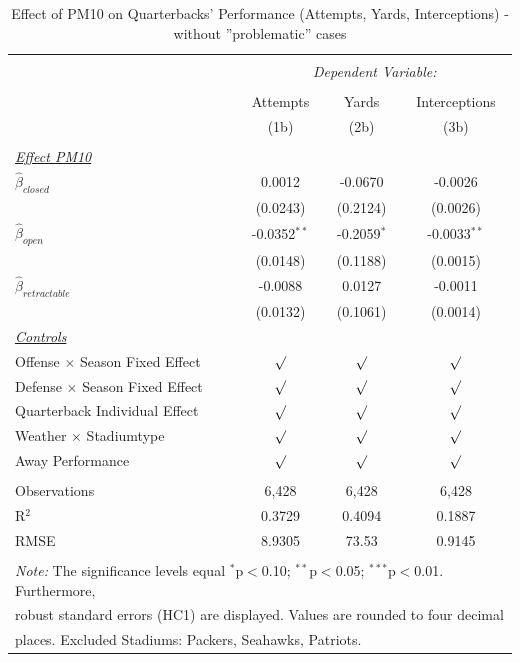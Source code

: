\documentclass[12pt,a4paper]{article}
\begin{document}
{\begin{table}[!htbp] \centering 
  \caption{Effect of PM10 on Quarterbacks' Performance (Attempts, Yards, Interceptions) - without ''problematic'' cases} 
  \label{A:T2} 
\begin{tabular}{@{\extracolsep{5pt}}lccc} 
\hline \\[-1.8ex] 
& \multicolumn{3}{c}{\textit{Dependent Variable:}} \\ \cline{2-4} \\ [-1.8ex]
& Attempts & Yards & Interceptions \\ 
& (1b) & (2b) & (3b)\\ \hline \\[-1.8ex] 
\underline{\textit{Effect PM10}}\\[0.4cm]
$\hat{\beta}_{closed}$& 0.0012 & -0.0670 & -0.0026 \\ 
& (0.0243)  & (0.2124)& (0.0026) \\[0.4cm]
$\hat{\beta}_{open}$& -0.0352$^{**}$ & -0.2059$^{*}$ & -0.0033$^{**}$\\ 
& (0.0148) & (0.1188) & (0.0015) \\[0.4cm]
$\hat{\beta}_{retractable}$& -0.0088 & 0.0127 & -0.0011 \\ 
& (0.0132) & (0.1061) & (0.0014)\\ [0.4cm]
\underline{\textit{Controls}} \\[0.4cm]
Offense $\times$ Season Fixed Effect & $\surd$ & $\surd$ & $\surd$ \\[0.4cm]
Defense $\times$ Season Fixed Effect & $\surd$ & $\surd$  & $\surd$ \\[0.4cm]
Quarterback Individual Effect & $\surd$ & $\surd$ & $\surd$  \\[0.4cm]
Weather $\times $ Stadiumtype & $\surd$ & $\surd$ & $\surd$ \\[0.4cm]
Away Performance & $\surd$ & $\surd$ & $\surd$\\
\hline \\[-1.8ex] 
Observations & 6,428 & 6,428 & 6,428 \\ 
R$^{2}$ & 0.3729 & 0.4094 & 0.1887 \\ 
RMSE & 8.9305 & 73.53 & 0.9145 \\ \hline 
\hline \\[-1.8ex]  
\multicolumn{4}{l}{\footnotesize \textit{Note:} The significance levels equal {$^{*}$p$<$0.10; $^{**}$p$<$0.05; $^{***}$p$<$0.01}.  Furthermore,} \\ \multicolumn{4}{l}{\footnotesize robust standard errors (HC1) are displayed. Values are rounded to four decimal} \\ \multicolumn{4}{l}{\footnotesize places. Excluded Stadiums: Packers, Seahawks, Patriots.}
  \end{tabular}
\end{table} 


}
\end{document}

